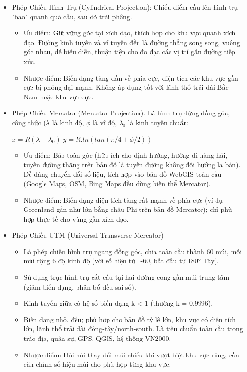 \begin{itemize}
    \item Phép Chiếu Hình Trụ (Cylindrical Projection): Chiếu điểm cầu lên hình trụ "bao" quanh quả cầu, sau đó trải phẳng.
    \begin{itemize}
        \item Ưu điểm: Giữ vững góc tại xích đạo, thích hợp cho khu vực quanh xích đạo. Đường kinh tuyến và vĩ tuyến đều là đường thẳng song song, vuông góc nhau, dễ biểu diễn, thuận tiện cho đo đạc các vị trí gần đường tiếp xúc.
        \item Nhược điểm: Biến dạng tăng dần về phía cực, diện tích các khu vực gần cực bị phóng đại mạnh. Không áp dụng tốt với lãnh thổ trải dài Bắc - Nam hoặc khu vực cực.
    \end{itemize}
    \item Phép Chiếu Mercator (Mercator Projection): Là hình trụ đứng đồng góc, công thức ($\lambda$ là kinh độ, $\phi$ là vĩ độ, $\lambda _0$ là kinh tuyến chuẩn: 
    \begin{center}
        $x = R(\lambda - \lambda _0)$
        $y = R.ln(tan(\pi/4 + \phi/2))$
    \end{center}
    \begin{itemize}
        \item Ưu điểm: Bảo toàn góc (hữu ích cho định hướng, hướng đi hàng hải, tuyến đường thẳng trên bản đồ là tuyến đường không đổi hướng la bàn). Dễ dàng chuyển đổi số liệu, tích hợp vào bản đồ WebGIS toàn cầu (Google Maps, OSM, Bing Maps đều dùng biến thể Mercator).
        \item Nhược điểm: Biến dạng diện tích tăng rất mạnh về phía cực (ví dụ Greenland gần như lớn bằng châu Phi trên bản đồ Mercator); chỉ phù hợp thực tế cho vùng gần xích đạo.
    \end{itemize}
    \item Phép Chiếu UTM (Universal Transverse Mercator)
    \begin{itemize}
        \item Là phép chiếu hình trụ ngang đồng góc, chia toàn cầu thành 60 múi, mỗi múi rộng 6 độ kinh độ (với số hiệu từ 1-60, bắt đầu từ 180° Tây).
        \item Sử dụng trục hình trụ cắt cầu tại hai đường cong gần múi trung tâm (giảm biến dạng, phân bổ đều sai số).
        \item Kinh tuyến giữa có hệ số biến dạng k < 1 (thường k = 0.9996).
        \item Biến dạng nhỏ, đều; phù hợp cho bản đồ tỷ lệ lớn, khu vực có diện tích lớn, lãnh thổ trải dài đông-tây/north-south. Là tiêu chuẩn toàn cầu trong trắc địa, quân sự, GPS, QGIS, hệ thống VN2000.
        \item Nhược điểm: Đòi hỏi thay đổi múi chiếu khi vượt biệt khu vực rộng, cần căn chỉnh số hiệu múi cho phù hợp từng khu vực.
    \end{itemize}
\end{itemize}

